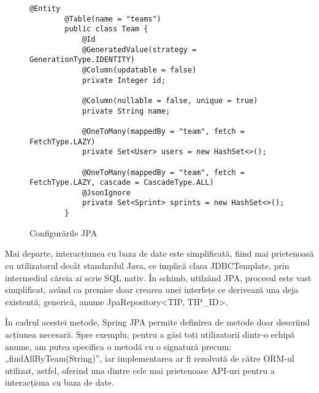 \begin{figure}[hbtp]
	\begin{lstlisting}[frame=single]
		@Entity
		@Table(name = "teams")
		public class Team {
		    @Id
		    @GeneratedValue(strategy = GenerationType.IDENTITY)
		    @Column(updatable = false)
		    private Integer id;
		
		    @Column(nullable = false, unique = true)
		    private String name;
		
		    @OneToMany(mappedBy = "team", fetch = FetchType.LAZY)
		    private Set<User> users = new HashSet<>();
		
		    @OneToMany(mappedBy = "team", fetch = FetchType.LAZY, cascade = CascadeType.ALL)
		    @JsonIgnore
		    private Set<Sprint> sprints = new HashSet<>();
		}
	\end{lstlisting}
	\caption{Configurările JPA}
\end{figure}

Mai departe, interacțiunea cu baza de date este simplificată, fiind mai prietenoasă cu utilizatorul decât standardul Java, ce implică clasa JDBCTemplate, prin intermediul căreia ai scrie SQL nativ. În schimb, utilzând JPA, procesul este vast simplificat, având ca premise doar crearea unei interfețe ce derivează una deja existentă, generică, anume JpaRepository<TIP, TIP_ID>. 

În cadrul acestei metode, Spring JPA permite definirea de metode doar descriind acțiunea necesară. Spre exemplu, pentru a găsi toți utilizatorii dintr-o echipă anume, am putea specifica o metodă cu o signatură precum: „findAllByTeam(String)”, iar implementarea ar fi rezolvată de către ORM-ul utilizat, astfel, oferind una dintre cele mai prietenoase API-uri pentru a interacționa cu baza de date.